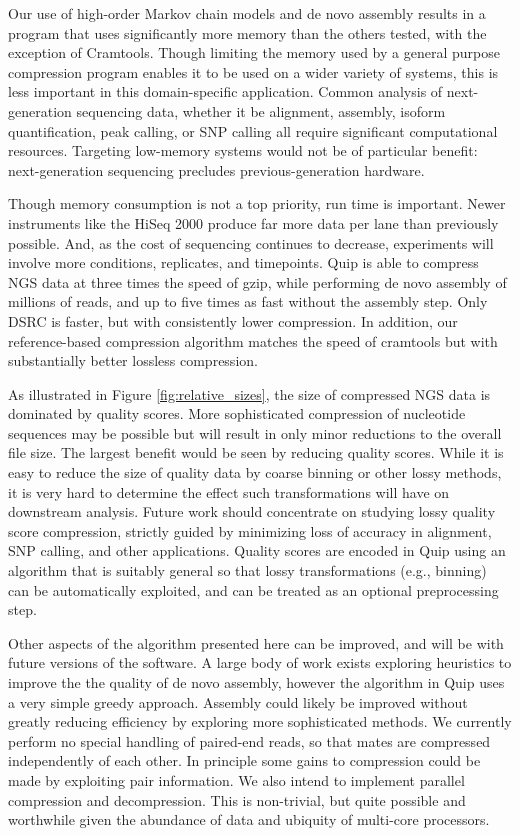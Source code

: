 \documentclass[a4,center,fleqn]{NAR}
\begin{document}
Our use of high-order Markov chain models and de novo assembly results in a
program that uses significantly more memory than the others tested, with the
exception of Cramtools. Though limiting the memory used by a general purpose
compression program enables it to be used on a wider variety of systems, this
is less important in this domain-specific application. Common analysis of
next-generation sequencing data, whether it be alignment, assembly, isoform
quantification, peak calling, or SNP calling all require significant
computational resources. Targeting low-memory systems would not be of
particular benefit: next-generation sequencing precludes previous-generation
hardware.

Though memory consumption is not a top priority, run time is important. Newer
instruments like the HiSeq 2000 produce far more data per lane than previously
possible. And, as the cost of sequencing continues to decrease, experiments
will involve more conditions, replicates, and timepoints.  Quip is able to
compress NGS data at three times the speed of gzip, while performing de novo
assembly of millions of reads, and up to five times as fast without the
assembly step. Only DSRC is faster, but with consistently lower compression.
In addition, our reference-based compression algorithm matches the speed
of cramtools but with substantially better lossless compression.

As illustrated in Figure \ref{fig:relative_sizes}, the size of compressed NGS
data is dominated by quality scores. More sophisticated compression of
nucleotide sequences may be possible but will result in only minor reductions
to the overall file size. The largest benefit would be seen by reducing
quality scores. While it is easy to reduce the size of quality data by coarse
binning or other lossy methods, it is very hard to determine the effect such
transformations will have on downstream analysis. Future work should
concentrate on studying lossy quality score compression, strictly guided by
minimizing loss of accuracy in alignment, SNP calling, and other applications.
Quality scores are encoded in Quip using an algorithm that is suitably
general so that lossy transformations (e.g., binning) can be automatically
exploited, and can be treated as an optional preprocessing step.

Other aspects of the algorithm presented here can be improved, and will be
with future versions of the software. A large body of work exists exploring
heuristics to improve the the quality of de novo assembly, however the
algorithm in Quip uses a very simple greedy approach. Assembly could likely be
improved without greatly reducing efficiency by exploring more sophisticated
methods. We currently perform no special handling of paired-end reads, so that
mates are compressed independently of each other. In principle some gains to
compression could be made by exploiting pair information. We also intend to
implement parallel compression and decompression. This is non-trivial,
but quite possible and worthwhile given the abundance of data and ubiquity of
multi-core processors.
\end{document}
